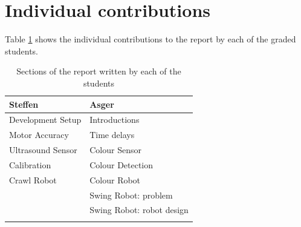 \documentclass[11pt, a4paper]{article}
\begin{document}
\section{Individual contributions}
Table \ref{tab:contributions} shows the individual contributions to the report by each of the graded students.
\begin{table}[H]
	\centering
	\begin{tabular}{l|l}
		Steffen & Asger \\ \hline
		Development Setup & Introductions\\
		Motor Accuracy & Time delays\\
		Ultrasound Sensor & Colour Sensor\\
		Calibration & Colour Detection\\
        Crawl Robot & Colour Robot \\
	     & Swing Robot: problem\\
	     & Swing Robot: robot design \\
	     & \\
     
		      
	\end{tabular}
	\caption{Sections of the report written by each of the students}
	\label{tab:contributions}
\end{table}




\end{document}

